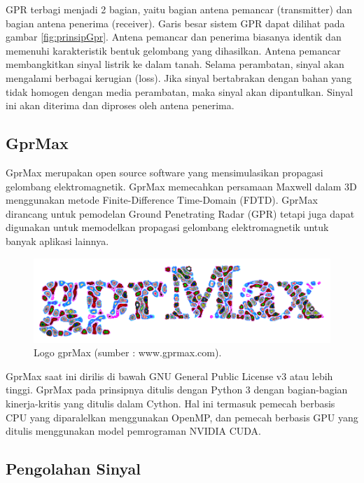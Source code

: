GPR terbagi menjadi 2 bagian, yaitu bagian antena pemancar (transmitter) dan bagian antena penerima (receiver). 
Garis besar sistem GPR dapat dilihat pada gambar \ref{fig:prinsipGpr}. 
Antena pemancar dan penerima biasanya identik dan memenuhi karakteristik bentuk gelombang yang dihasilkan. 
Antena pemancar membangkitkan sinyal listrik ke dalam tanah. 
Selama perambatan, sinyal akan mengalami berbagai kerugian (loss). 
Jika sinyal bertabrakan dengan bahan yang tidak homogen dengan media perambatan, maka sinyal akan dipantulkan. 
Sinyal ini akan diterima dan diproses oleh antena penerima.

\subsection{GprMax}
\label{subsec:gprMax}

GprMax merupakan open source software yang mensimulasikan propagasi gelombang elektromagnetik. 
GprMax memecahkan persamaan Maxwell dalam 3D menggunakan metode Finite-Difference Time-Domain (FDTD). 
GprMax dirancang untuk pemodelan Ground Penetrating Radar (GPR) tetapi juga dapat digunakan untuk memodelkan propagasi gelombang elektromagnetik untuk banyak aplikasi lainnya. 

\begin{figure}[ht]
  \centering
  \includegraphics[scale=0.35]{gambar/gprMax.png}
  \caption{Logo gprMax (sumber : www.gprmax.com).}
  \label{fig:logogprMax}
\end{figure}

GprMax saat ini dirilis di bawah GNU General Public License v3 atau lebih tinggi. 
GprMax pada prinsipnya ditulis dengan Python 3 dengan bagian-bagian kinerja-kritis yang ditulis dalam Cython. 
Hal ini termasuk pemecah berbasis CPU yang diparalelkan menggunakan OpenMP, dan pemecah berbasis GPU yang ditulis menggunakan model pemrograman NVIDIA CUDA. \parencite{gprMax}

\subsection{Pengolahan Sinyal}
\label{subsec:pengolahanSinyal}

